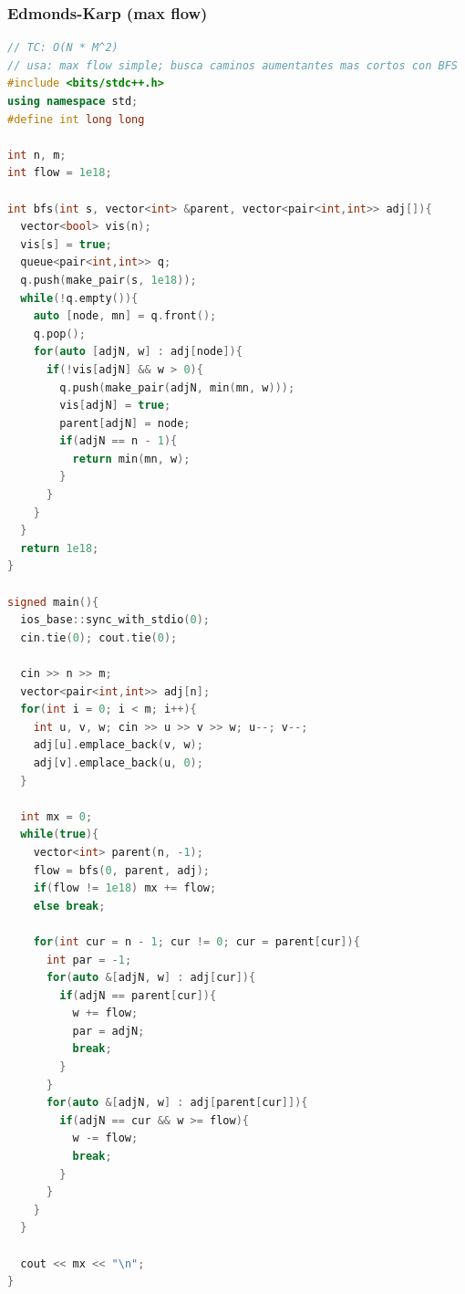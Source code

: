 \subsubsection{Edmonds-Karp (max flow)}
\begin{lstlisting}[style=mystyle, language=C++]
// TC: O(N * M^2)
// usa: max flow simple; busca caminos aumentantes mas cortos con BFS
#include <bits/stdc++.h>
using namespace std;
#define int long long

int n, m;
int flow = 1e18;

int bfs(int s, vector<int> &parent, vector<pair<int,int>> adj[]){
  vector<bool> vis(n);
  vis[s] = true;
  queue<pair<int,int>> q;
  q.push(make_pair(s, 1e18));
  while(!q.empty()){
    auto [node, mn] = q.front();
    q.pop();
    for(auto [adjN, w] : adj[node]){
      if(!vis[adjN] && w > 0){
        q.push(make_pair(adjN, min(mn, w)));
        vis[adjN] = true;
        parent[adjN] = node;
        if(adjN == n - 1){
          return min(mn, w);
        }
      }
    }
  }
  return 1e18;
}

signed main(){
  ios_base::sync_with_stdio(0);
  cin.tie(0); cout.tie(0);
  
  cin >> n >> m;
  vector<pair<int,int>> adj[n];
  for(int i = 0; i < m; i++){
    int u, v, w; cin >> u >> v >> w; u--; v--;
    adj[u].emplace_back(v, w);
    adj[v].emplace_back(u, 0);
  }

  int mx = 0;
  while(true){
    vector<int> parent(n, -1);
    flow = bfs(0, parent, adj);
    if(flow != 1e18) mx += flow;
    else break;

    for(int cur = n - 1; cur != 0; cur = parent[cur]){
      int par = -1;
      for(auto &[adjN, w] : adj[cur]){
        if(adjN == parent[cur]){
          w += flow;
          par = adjN;
          break;
        }
      }
      for(auto &[adjN, w] : adj[parent[cur]]){
        if(adjN == cur && w >= flow){
          w -= flow;
          break;
        }
      }
    }
  }

  cout << mx << "\n";
}
\end{lstlisting}
